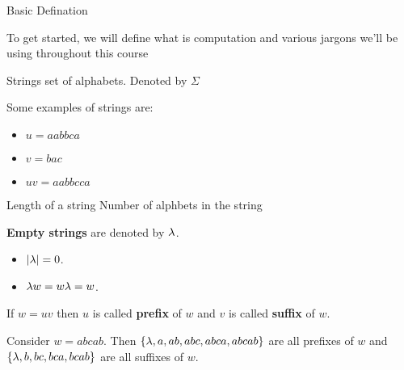 	\begin{section}{Basic Defination}

		To get started, we will define what is computation and various jargons we'll be using throughout this course
		\begin{definition}{Strings}
			set of alphabets. Denoted by $\Sigma$
		\end{definition}
		
		\begin{example}
			Some examples of strings are:
			\begin{itemize}
				\item $u = aabbca$
				\item $v = bac$
				\item $uv = aabbcca$
			\end{itemize}
		\end{example}

		\begin{definition}{Length of a string}
			Number of alphbets in the string
		\end{definition}

		\textbf{Empty strings} are denoted by $\lambda$. 
		\begin{itemize}
			\item $\left| \lambda \right| = 0$.
			\item $\lambda w = w \lambda = w$.
		\end{itemize}

		If $w = uv$ then $u$ is called \textbf{prefix} of $w$ and $v$ is called \textbf{suffix} of $w$. \\
		
		\begin{example}
			Consider $w = abcab$. Then $\{\lambda, a, ab, abc, abca, abcab\}$ are all prefixes of $w$ and $\{\lambda, b, bc, bca, bcab\}$ are all suffixes of $w$.
		\end{example}

		
	\end{section}	
